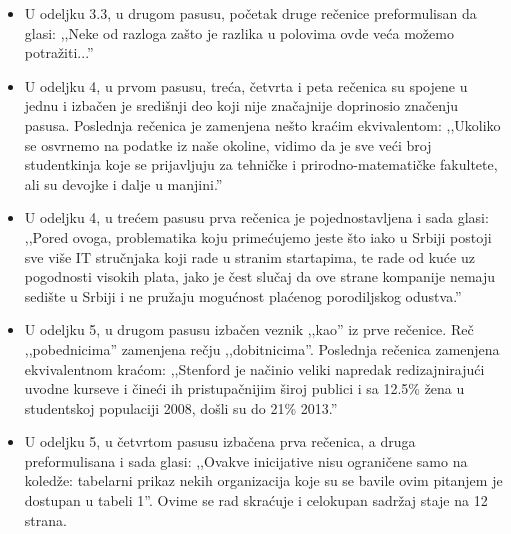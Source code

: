 \documentclass[a4paper]{report}
\begin{document}
{\begin{itemize}
\item U odeljku 3.3, u drugom pasusu, početak druge rečenice preformulisan da glasi: ,,Neke od razloga zašto je razlika u polovima ovde veća možemo potražiti...''
\item U odeljku 4, u prvom pasusu, treća, četvrta i peta rečenica su spojene u jednu i izbačen je središnji deo koji nije značajnije doprinosio značenju pasusa. Poslednja rečenica je zamenjena nešto kraćim ekvivalentom: ,,Ukoliko se osvrnemo na podatke iz naše okoline, vidimo da je sve veći broj studentkinja koje se prijavljuju za tehničke i prirodno-matematičke fakultete, ali su devojke i dalje u manjini.''
\item U odeljku 4, u trećem pasusu prva rečenica je pojednostavljena i sada glasi: ,,Pored ovoga, problematika koju primećujemo jeste što iako u Srbiji postoji sve više IT stručnjaka koji rade u stranim startapima, te rade od kuće uz pogodnosti visokih plata, jako je čest slučaj da ove strane kompanije nemaju sedište u Srbiji i ne pružaju mogućnost plaćenog porodiljskog odustva.''
\item U odeljku 5, u drugom pasusu izbačen veznik ,,kao'' iz prve rečenice. Reč ,,pobednicima'' zamenjena rečju ,,dobitnicima''. Poslednja rečenica zamenjena ekvivalentnom kraćom: ,,Stenford je načinio veliki napredak redizajnirajući uvodne kurseve i čineći ih pristupačnijim široj publici i sa 12.5\% žena u studentskoj populaciji 2008, došli su do 21\% 2013.''
\item U odeljku 5, u četvrtom pasusu izbačena prva rečenica, a druga preformulisana i sada glasi: ,,Ovakve inicijative nisu ograničene samo na koledže: tabelarni prikaz nekih organizacija koje su se bavile ovim pitanjem je dostupan u tabeli 1''. Ovime se rad skraćuje i celokupan sadržaj staje na 12 strana.
\end{itemize}
}
\end{document}
